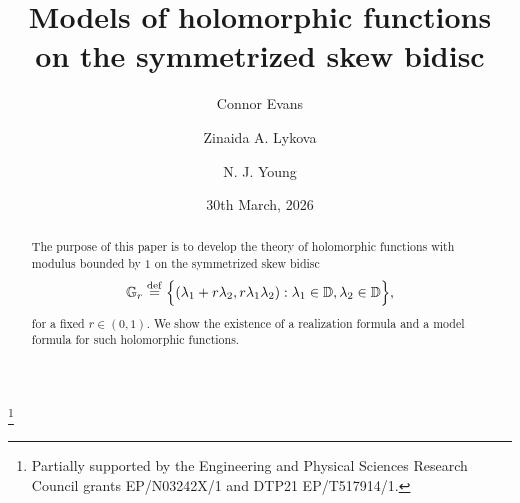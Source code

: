 \documentclass[12pt,reqno]{amsart}
\numberwithin{equation}{section}
\theoremstyle{definition}
\begin{document}
 













\title[Models of holomorphic functions on the symmetrized skew bidisc]{Models of holomorphic functions on \newline the symmetrized skew bidisc}

\author{Connor Evans}
\address{School of Mathematics,  Statistics and Physics, Newcastle University, Newcastle upon Tyne
	NE\textup{1} \textup{7}RU, U.K.}

\author{Zinaida A. Lykova}
\address{School of Mathematics,  Statistics and Physics, Newcastle University, Newcastle upon Tyne
	NE\textup{1} \textup{7}RU, U.K.}

\author{N. J. Young}
\address{School of Mathematics, Statistics and Physics, Newcastle University, Newcastle upon Tyne NE1 7RU, U.K.}

\date{30th March, 2026}



\thanks{Partially supported by the Engineering and Physical Sciences Research Council grants EP/N03242X/1 and  DTP21  EP/T517914/1. } 







\begin{abstract}
The purpose of this paper is to develop the theory of holomorphic functions 
with modulus bounded by $1$ on  the symmetrized skew bidisc
\[ \mathbb{G}_{r} \stackrel{\rm def}{=}  \Big\{( \lambda_{1}+r\lambda_{2} ,r\lambda_{1}\lambda_{2}): \lambda_{1}\in \mathbb{D}, \lambda_{2}\in\mathbb{D}\Big\},
\]
for a fixed $r \in (0,1)$. We show the existence of a realization formula and a model formula for such holomorphic functions.

\end{abstract} 
\end{document}
